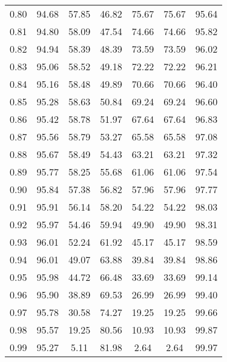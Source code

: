 \begin{tabular}{|c|c|c|c|c|c|c|}
      0.80 &     94.68 &     57.85 &      46.82 &   75.67 &      75.67 &         95.64 \\
      0.81 &     94.80 &     58.09 &      47.54 &   74.66 &      74.66 &         95.82 \\
      0.82 &     94.94 &     58.39 &      48.39 &   73.59 &      73.59 &         96.02 \\
      0.83 &     95.06 &     58.52 &      49.18 &   72.22 &      72.22 &         96.21 \\
      0.84 &     95.16 &     58.48 &      49.89 &   70.66 &      70.66 &         96.40 \\
      0.85 &     95.28 &     58.63 &      50.84 &   69.24 &      69.24 &         96.60 \\
      0.86 &     95.42 &     58.78 &      51.97 &   67.64 &      67.64 &         96.83 \\
      0.87 &     95.56 &     58.79 &      53.27 &   65.58 &      65.58 &         97.08 \\
      0.88 &     95.67 &     58.49 &      54.43 &   63.21 &      63.21 &         97.32 \\
      0.89 &     95.77 &     58.25 &      55.68 &   61.06 &      61.06 &         97.54 \\
      0.90 &     95.84 &     57.38 &      56.82 &   57.96 &      57.96 &         97.77 \\
      0.91 &     95.91 &     56.14 &      58.20 &   54.22 &      54.22 &         98.03 \\
      0.92 &     95.97 &     54.46 &      59.94 &   49.90 &      49.90 &         98.31 \\
      0.93 &     96.01 &     52.24 &      61.92 &   45.17 &      45.17 &         98.59 \\
      0.94 &     96.01 &     49.07 &      63.88 &   39.84 &      39.84 &         98.86 \\
      0.95 &     95.98 &     44.72 &      66.48 &   33.69 &      33.69 &         99.14 \\
      0.96 &     95.90 &     38.89 &      69.53 &   26.99 &      26.99 &         99.40 \\
      0.97 &     95.78 &     30.58 &      74.27 &   19.25 &      19.25 &         99.66 \\
      0.98 &     95.57 &     19.25 &      80.56 &   10.93 &      10.93 &         99.87 \\
      0.99 &     95.27 &      5.11 &      81.98 &    2.64 &       2.64 &         99.97 \\
\bottomrule
\end{tabular}

